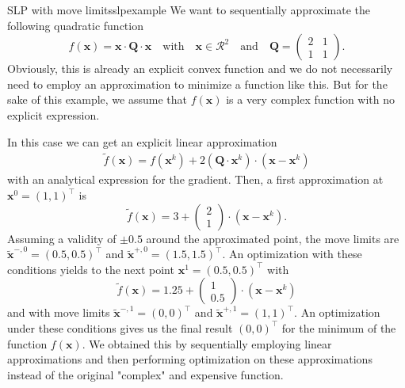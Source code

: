 \begin{example}{SLP with move limits}{slpexample}
    We want to sequentially approximate the following quadratic function
    \begin{equation}
             f(\mathbf{x})= \mathbf{x} \cdot \mathbf{Q} \cdot \mathbf{x} \quad \text{with} \quad \mathbf{x} \in \mathcal{R}^2 \quad \text{and} \quad 
             \mathbf{Q} = 
            \begin{pmatrix}
            2 & 1 \\
            1 & 1 
            \end{pmatrix}. 
    \end{equation}
    Obviously, this is already an explicit convex function and we do not necessarily need to employ an approximation to minimize a function like this. But for the sake of this example, we assume that $f(\mathbf{x})$ is a very complex function with no explicit expression. 
    
    In this case we can get an explicit linear approximation
    \begin{align}
        \tilde{f}(\mathbf{x}) = f(\mathbf{x}^k) + 2(\mathbf{Q} \cdot \mathbf{x}^k) \cdot \left(\mathbf{x} - \mathbf{x}^k \right)
    \end{align}
    with an analytical expression for the gradient. Then, a first approximation at $\mathbf{x}^0=(1,1)^\top$ is 
    \begin{equation}
        \tilde{f}(\mathbf{x}) = 3 + \begin{pmatrix} 2\\1 \end{pmatrix} \cdot \left(\mathbf{x} - \mathbf{x}^k \right).
    \end{equation}
    Assuming a validity of $\pm 0.5$ around the approximated point, the move limits are $\tilde{\mathbf{x}}^{-,0}=(0.5, 0.5)^\top$ and  $\tilde{\mathbf{x}}^{+,0}=(1.5, 1.5)^\top$.  
    An optimization with these conditions yields to the next point $\mathbf{x}^1=(0.5,0.5)^\top$ with 
    \begin{equation}
        \tilde{f}(\mathbf{x}) = 1.25 + \begin{pmatrix} 1\\0.5 \end{pmatrix} \cdot \left(\mathbf{x} - \mathbf{x}^k \right)
    \end{equation}
    and with move limits $\tilde{\mathbf{x}}^{-,1}=(0, 0)^\top$ and  $\tilde{\mathbf{x}}^{+,1}=(1, 1)^\top$. 
    An optimization under these conditions gives us the final result $(0,0)^\top$ for the minimum of the function $f(\mathbf{x})$. We obtained this by sequentially employing linear approximations and then performing optimization on these approximations instead of the original "complex" and expensive function.
\end{example}


